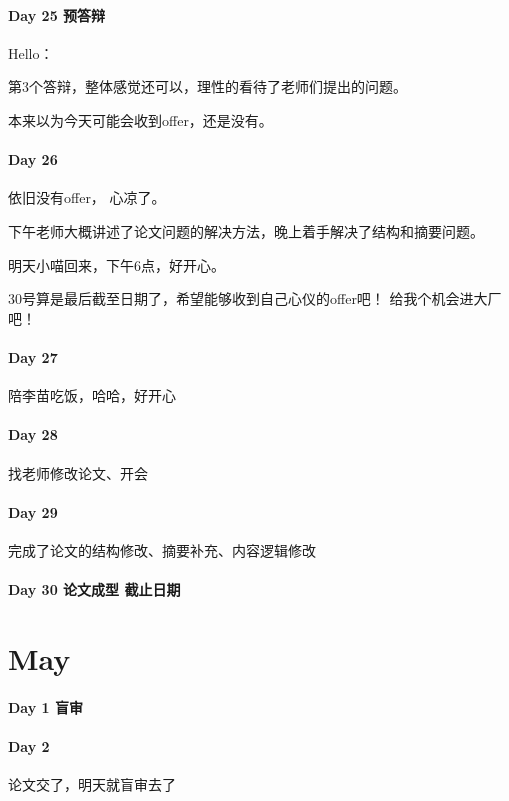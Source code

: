 \documentclass[UTF8,a4paper,8pt]{ctexart}
\begin{document}
 	 \paragraph{Day 25  预答辩    \quad     }
	 	 Hello：
	 	 
	 	 第3个答辩，整体感觉还可以，理性的看待了老师们提出的问题。
	 	 
	 	 本来以为今天可能会收到offer，还是没有。
 	 \paragraph{Day 26      \quad     }
	 	 依旧没有offer， 心凉了。
	 	 
	 	 下午老师大概讲述了论文问题的解决方法，晚上着手解决了结构和摘要问题。
	 	 
	 	 明天小喵回来，下午6点，好开心。
	 	 
	 	 30号算是最后截至日期了，希望能够收到自己心仪的offer吧！ 给我个机会进大厂吧！
 	 \paragraph{Day 27      \quad     }
	 	 陪李苗吃饭，哈哈，好开心
	 	 
	 	 
 	 \paragraph{Day 28      \quad     }
	 	 找老师修改论文、开会
	 	 
 	 \paragraph{Day 29      \quad     }   
	 	 完成了论文的结构修改、摘要补充、内容逻辑修改
 	 
 	 \paragraph{Day 30  论文成型 截止日期    \quad     }
 	 
\section{May}
 	 \paragraph{Day 1   盲审    \quad     }
 	 \paragraph{Day 2       \quad     }
	 	 论文交了，明天就盲审去了
	 	 
\end{document}
